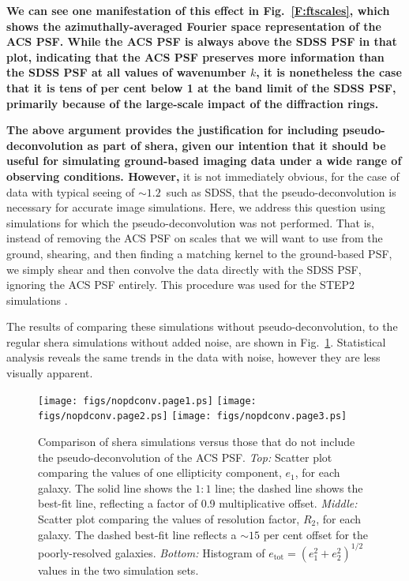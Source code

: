 \documentclass[twocolumn,useAMS,usenatbib]{mn2e}
\newcommand{\newtext}{}
\newcommand{\reftext}[1]{\textbf{#1}}
\begin{document}
\reftext{We can see one
  manifestation of this effect in Fig.~\ref{F:ftscales}, which shows the
  azimuthally-averaged Fourier space representation of the ACS PSF.
  While the ACS PSF is always above the SDSS PSF in that plot,
  indicating that the ACS PSF preserves more information than the SDSS
  PSF at all values of wavenumber $k$, it is nonetheless the case that
  it is tens of per cent below 1 at the band limit of the SDSS PSF,
  primarily because of the large-scale impact of the diffraction
  rings.}  

\reftext{The above argument provides the justification for including
pseudo-deconvolution as part of {\sc shera}, given our intention that
it should be useful for simulating ground-based imaging data under a
wide range of observing conditions.  However,}  it is not immediately obvious, for the case of data with typical
seeing of $\sim 1.2$\arcsec\ such as SDSS, that the
pseudo-deconvolution is necessary for accurate image simulations.  Here, we address this question using simulations for which the
pseudo-deconvolution was not performed.  That is, instead of removing
the ACS PSF on scales that we will want to use from the ground,
shearing, and then finding a matching kernel to the ground-based PSF,
we simply shear and then convolve the data directly with the SDSS PSF,
ignoring the ACS PSF entirely.  This procedure was used for the STEP2
simulations \citep{2007MNRAS.376...13M}.

The results of comparing these simulations without
pseudo-deconvolution, to the regular {\sc shera} simulations without
added noise, are
shown in Fig.~\ref{F:nopdconv}.
Statistical analysis reveals the same trends in the data with noise,
however they are less visually apparent.
\begin{figure}
\begin{center}
\texttt{[image: figs/nopdconv.page1.ps]}
\texttt{[image: figs/nopdconv.page2.ps]}
\texttt{[image: figs/nopdconv.page3.ps]}
\caption{\label{F:nopdconv}
Comparison of {\sc shera} simulations versus those that do not include
the pseudo-deconvolution of the ACS PSF.  {\em
  Top:} Scatter plot comparing the values of one ellipticity
component, $e_1$, for each galaxy. The solid line shows the $1:1$
line; \newtext{the dashed line shows the best-fit line, reflecting a
  factor of 0.9 multiplicative offset.} {\em Middle:} Scatter plot
comparing the values of resolution factor, $R_2$, for each galaxy.
\newtext{The dashed best-fit line reflects a $\sim 15$ per cent offset
  for the poorly-resolved galaxies.} 
{\em Bottom:} Histogram of $e_\mathrm{tot}=(e_1^2+e_2^2)^{1/2}$ values
in the two simulation sets.}
\end{center}
\end{figure}
\end{document}
